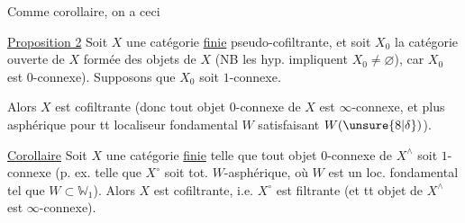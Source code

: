 Comme corollaire, on a ceci

\uline{Proposition 2} Soit $X$ une catégorie \uline{finie} pseudo-cofiltrante,  et soit $X_0$ la catégorie ouverte de $X$ formée des  objets de $X$ (NB les hyp. impliquent $X_0\ne\varnothing$), car $X_0$ est $0$-connexe). Supposons que $X_0$ soit $1$-connexe.

Alors $X$ est cofiltrante (donc tout objet $0$-connexe de $X$ est $\infty$-connexe, et plus  asphérique pour tt  localiseur fondamental $W$ satisfaisant $W(\unsure{8|\delta})$).

 \uline{Corollaire} Soit $X$ une catégorie \uline{finie} telle que tout objet $0$-connexe de $X^\wedge$ soit $1$-connexe (p. ex. telle que $X^\circ$ soit tot. $W$-asphérique, où $W$ est un loc. fondamental tel que $W\subset\mathbb{W}_1$). Alors $X$ est cofiltrante, i.e. $X^\circ$ est filtrante (et tt objet de $X^\wedge$ est $\infty$-connexe).
